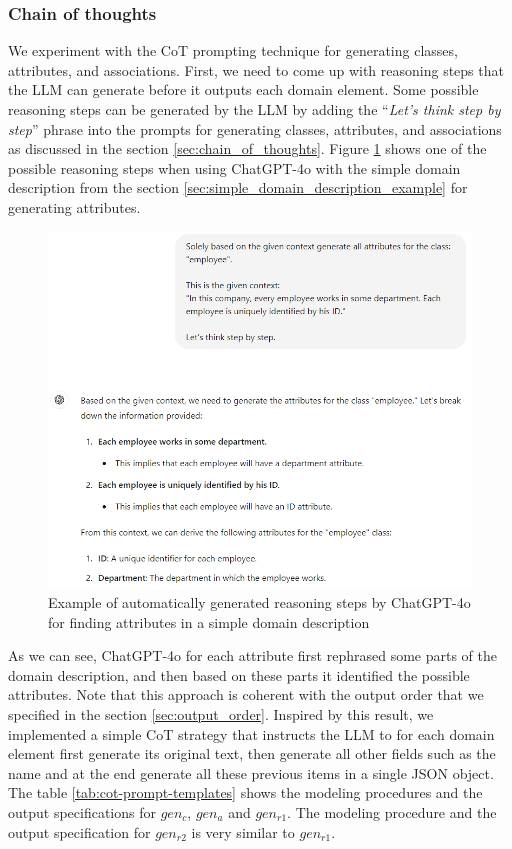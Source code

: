 \subsubsection{Chain of thoughts}

We experiment with the CoT prompting technique for generating classes, attributes, and associations. First, we need to come up with reasoning steps that the LLM can generate before it outputs each domain element. Some possible reasoning steps can be generated by the LLM by adding the ``\textit{Let's think step by step}'' phrase into the prompts for generating classes, attributes, and associations as discussed in the section \ref{sec:chain_of_thoughts}. Figure \ref{fig:cot-think-step-by-step} shows one of the possible reasoning steps when using ChatGPT-4o with the simple domain description from the section \ref{sec:simple_domain_description_example} for generating attributes.

\begin{figure}[!h]
    \centering
    \includegraphics[scale=0.6]{img/cot-think-step-by-step.png}
    \caption{\centering Example of automatically generated reasoning steps by ChatGPT-4o for finding attributes in a simple domain description}
    \label{fig:cot-think-step-by-step}
\end{figure}

As we can see, ChatGPT-4o for each attribute first rephrased some parts of the domain description, and then based on these parts it identified the possible attributes. Note that this approach is coherent with the output order that we specified in the section \ref{sec:output_order}. Inspired by this result, we implemented a simple CoT strategy that instructs the LLM to for each domain element first generate its original text, then generate all other fields such as the name and at the end generate all these previous items in a single JSON object. The table \ref{tab:cot-prompt-templates} shows the modeling procedures and the output specifications for $gen_c$, $gen_a$ and $gen_{r1}$. The modeling procedure and the output specification for $gen_{r2}$ is very similar to $gen_{r1}$.

